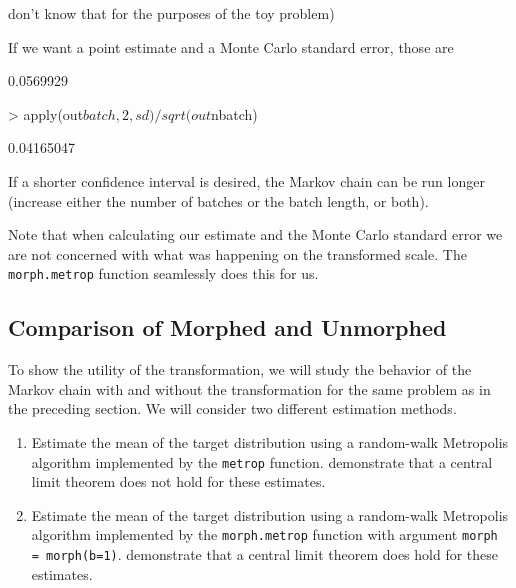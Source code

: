 \documentclass{article}
\begin{document}
don't know that for the purposes of the toy problem)
\begin{Schunk}
\end{Schunk}
If we want a point estimate and a Monte Carlo standard error, those are
\begin{Schunk}
\begin{Soutput}
[1] 0.0569929
\end{Soutput}
\begin{Sinput}
> apply(out$batch, 2, sd) / sqrt(out$nbatch)
\end{Sinput}
\begin{Soutput}
[1] 0.04165047
\end{Soutput}
\end{Schunk}
If a shorter confidence interval is desired, the Markov chain can be run
longer (increase either the number of batches or the batch length, or both).

Note that when calculating our estimate and the Monte Carlo standard error
we are not concerned with what was happening on the transformed scale.  The
\texttt{morph.metrop} function seamlessly does this for us.

\subsection{Comparison of Morphed and Unmorphed}

To show the utility of the transformation, we will study the behavior
of the Markov chain with and without the transformation for the same
problem as in the preceding section.
We will consider two different estimation methods.
\begin{enumerate}
\item \label{enum:rw} Estimate the mean of the target distribution
  using a random-walk Metropolis algorithm implemented by the \texttt{metrop}
  function.  \citet{jarner-roberts} demonstrate that a central limit
  theorem does not hold for these estimates.
\item \label{enum:rw-induced} Estimate the mean of the target distribution
  using a random-walk Metropolis algorithm implemented by the
  \texttt{morph.metrop} function with argument \texttt{morph = morph(b=1)}.
  \citet{johnson-geyer} demonstrate that a central limit
  theorem does hold for these estimates.
\end{enumerate}
\end{document}
